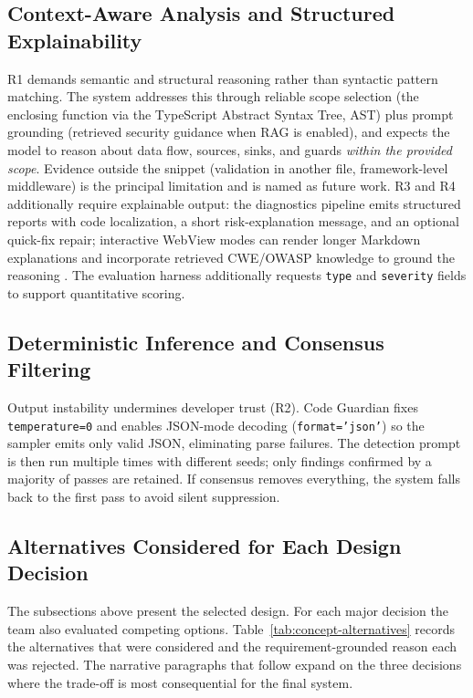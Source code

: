 \subsection{Context-Aware Analysis and Structured Explainability}
\label{subsec:context-explain}

R1 demands semantic and structural reasoning rather than syntactic pattern matching. The system addresses this through reliable scope selection (the enclosing function via the TypeScript Abstract Syntax Tree, AST) plus prompt grounding (retrieved security guidance when RAG is enabled), and expects the model to reason about data flow, sources, sinks, and guards \emph{within the provided scope}. Evidence outside the snippet (validation in another file, framework-level middleware) is the principal limitation and is named as future work. R3 and R4 additionally require explainable output: the diagnostics pipeline emits structured reports with code localization, a short risk-explanation message, and an optional quick-fix repair; interactive WebView modes can render longer Markdown explanations and incorporate retrieved CWE/OWASP knowledge to ground the reasoning \cite{mitreCWE,owaspCheatSheets}. The evaluation harness additionally requests \texttt{type} and \texttt{severity} fields to support quantitative scoring.

\subsection{Deterministic Inference and Consensus Filtering}
\label{subsec:deterministic-consensus}

Output instability undermines developer trust (R2). Code Guardian fixes \texttt{temperature=0} and enables JSON-mode decoding (\texttt{format='json'}) so the sampler emits only valid JSON, eliminating parse failures. The detection prompt is then run multiple times with different seeds; only findings confirmed by a majority of passes are retained. If consensus removes everything, the system falls back to the first pass to avoid silent suppression.

\subsection{Alternatives Considered for Each Design Decision}
\label{subsec:alternatives-considered}

The subsections above present the selected design. For each major decision the team also evaluated competing options. Table~\ref{tab:concept-alternatives} records the alternatives that were considered and the requirement-grounded reason each was rejected. The narrative paragraphs that follow expand on the three decisions where the trade-off is most consequential for the final system.

